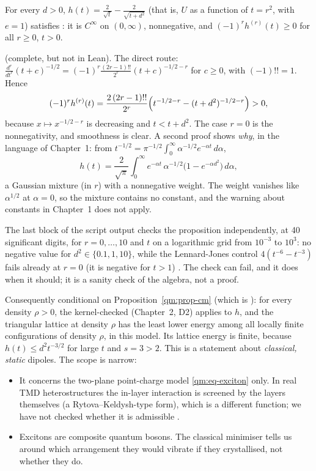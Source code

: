 \begin{proposition}\label{qm:prop-cm}
For every $d>0$, $h(t)=\frac2{\sqrt t}-\frac2{\sqrt{t+d^2}}$ (that is, $U$ as a function of $t=r^2$, with $e=1$)
satisfies : it is $C^\infty$ on $(0,\infty)$, nonnegative, and $(-1)^rh^{(r)}(t)\ge0$ for all
$r\ge0$, $t>0$.
\end{proposition}
\begin{humanproof}
\tierC{} (complete, but not in Lean). The direct route: $\frac{d^r}{dt^r}(t+c)^{-1/2}=(-1)^r\frac{(2r-1)!!}{2^r}(t+c)^{-1/2-r}$
for $c\ge0$, with $(-1)!!=1$. Hence
\[
(-1)^rh^{(r)}(t)=\frac{2\,(2r-1)!!}{2^r}\Bigl(t^{-1/2-r}-(t+d^2)^{-1/2-r}\Bigr)>0,
\]
because $x\mapsto x^{-1/2-r}$ is decreasing and $t<t+d^2$. The case $r=0$ is the nonnegativity, and smoothness is
clear. A second proof shows \emph{why}, in the language of Chapter~1: from
$t^{-1/2}=\pi^{-1/2}\int_0^\infty\alpha^{-1/2}e^{-\alpha t}\,d\alpha$,
\[
h(t)=\frac{2}{\sqrt\pi}\int_0^\infty e^{-\alpha t}\,\alpha^{-1/2}\bigl(1-e^{-\alpha d^2}\bigr)\,d\alpha ,
\]
a Gaussian mixture (in $r$) with a nonnegative weight. The weight vanishes like $\alpha^{1/2}$ at $\alpha=0$, so the
mixture contains no constant, and the warning about constants in Chapter~1 does not apply.
\end{humanproof}

The last block of the script output checks the proposition independently, at 40 significant digits, for $r=0,\dots,10$
and $t$ on a logarithmic grid from $10^{-3}$ to $10^3$: no negative value for $d^2\in\{0.1,1,10\}$, while the
Lennard-Jones control $4(t^{-6}-t^{-3})$ fails already at $r=0$ (it is negative for $t>1$) \tierX. The check can
fail, and it does when it should; it is a sanity check of the algebra, not a proof.

Consequently \tierA{} conditional on Proposition~\ref{qm:prop-cm} (which is \tierC): for every density $\rho>0$, the
kernel-checked  (Chapter~2, D2) applies to $h$, and the triangular lattice at density
$\rho$ has the least lower energy among all locally finite configurations of density $\rho$, in this model. Its lattice
energy is finite, because $h(t)\le d^2t^{-3/2}$ for large $t$ and $s=3>2$. This is a statement about \emph{classical,
static} dipoles. The scope is narrow:
\begin{itemize}
\item It concerns the two-plane point-charge model \eqref{qm:eq-exciton} only. In real TMD heterostructures the
in-layer interaction is screened by the layers themselves (a Rytova--Keldysh-type form), which is a different function;
we have not checked whether it is admissible \tierC.
\item Excitons are composite quantum bosons. The classical minimiser tells us around which arrangement they would
vibrate if they crystallised, not whether they do.
\end{itemize}

